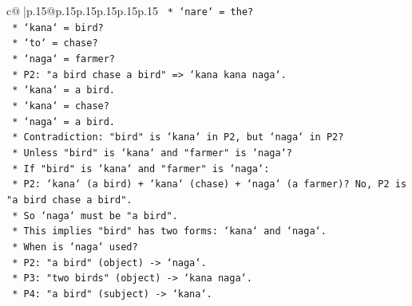 \documentclass{article}
\begin{document}
{\begin{supertabular}{c@{$\;$}|p{.15\linewidth}@{}p{.15\linewidth}p{.15\linewidth}p{.15\linewidth}p{.15\linewidth}p{.15\linewidth}}
{{{\texttt{                                                        *   `nare` = the?} \\
\texttt{                                                        *   `kana` = bird?} \\
\texttt{                                                        *   `to` = chase?} \\
\texttt{                                                        *   `naga` = farmer?} \\
\texttt{                                                    *   P2: "a bird chase a bird" => `kana kana naga`.} \\
\texttt{                                                        *   `kana` = a bird.} \\
\texttt{                                                        *   `kana` = chase?} \\
\texttt{                                                        *   `naga` = a bird.} \\
\texttt{                                                        *   Contradiction: "bird" is `kana` in P2, but `naga` in P2?} \\
\texttt{                                                        *   Unless "bird" is `kana` and "farmer" is `naga`?} \\
\texttt{                                                        *   If "bird" is `kana` and "farmer" is `naga`:} \\
\texttt{                                                            *   P2: `kana` (a bird) + `kana` (chase) + `naga` (a farmer)? No, P2 is "a bird chase a bird".} \\
\texttt{                                                            *   So `naga` must be "a bird".} \\
\texttt{                                                            *   This implies "bird" has two forms: `kana` and `naga`.} \\
\texttt{                                                            *   When is `naga` used?} \\
\texttt{                                                                *   P2: "a bird" (object) {-}> `naga`.} \\
\texttt{                                                                *   P3: "two birds" (object) {-}> `kana naga`.} \\
\texttt{                                                                *   P4: "a bird" (subject) {-}> `kana`.} \\
}}}
\end{supertabular}}
\end{document}
